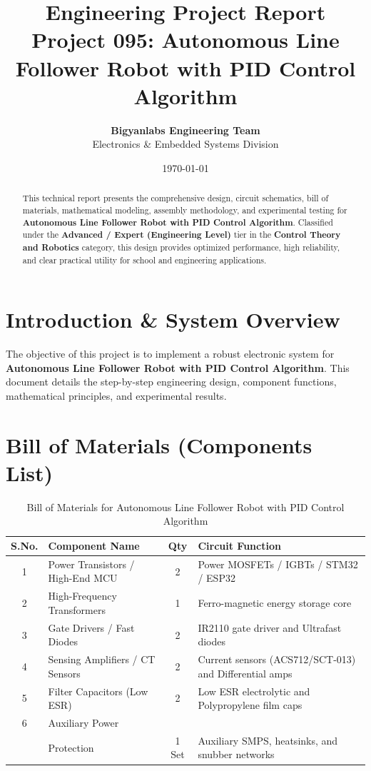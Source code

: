 \documentclass[11pt,a4paper]{article}
\title{\textbf{\Huge Engineering Project Report}\\[0.5em] \Large Project 095: Autonomous Line Follower Robot with PID Control Algorithm}
\author{\textbf{Bigyanlabs Engineering Team}\\ Electronics \& Embedded Systems Division}
\date{\today}
\begin{document}
\maketitle
\thispagestyle{empty}

\begin{abstract}
This technical report presents the comprehensive design, circuit schematics, bill of materials, mathematical modeling, assembly methodology, and experimental testing for \textbf{Autonomous Line Follower Robot with PID Control Algorithm}. Classified under the \textbf{Advanced / Expert (Engineering Level)} tier in the \textbf{Control Theory and Robotics} category, this design provides optimized performance, high reliability, and clear practical utility for school and engineering applications.
\end{abstract}

\newpage
\tableofcontents
\newpage

\section{Introduction \& System Overview}
The objective of this project is to implement a robust electronic system for \textbf{Autonomous Line Follower Robot with PID Control Algorithm}. This document details the step-by-step engineering design, component functions, mathematical principles, and experimental results.

\section{Bill of Materials (Components List)}
\begin{table}[h!]
\centering
\caption{Bill of Materials for Autonomous Line Follower Robot with PID Control Algorithm}
\vspace{0.5em}
\begin{tabular}{clcp{7cm}}
\toprule
\textbf{S.No.} & \textbf{Component Name} & \textbf{Qty} & \textbf{Circuit Function} \\
\midrule
1 & Power Transistors / High-End MCU & 2 & Power MOSFETs / IGBTs / STM32 / ESP32 \\
2 & High-Frequency Transformers & 1 & Ferro-magnetic energy storage core \\
3 & Gate Drivers / Fast Diodes & 2 & IR2110 gate driver and Ultrafast diodes \\
4 & Sensing Amplifiers / CT Sensors & 2 & Current sensors (ACS712/SCT-013) and Differential amps \\
5 & Filter Capacitors (Low ESR) & 2 & Low ESR electrolytic and Polypropylene film caps \\
6 & Auxiliary Power \\& Protection & 1 Set & Auxiliary SMPS, heatsinks, and snubber networks \\
\bottomrule
\end{tabular}
\end{table}
\end{document}
